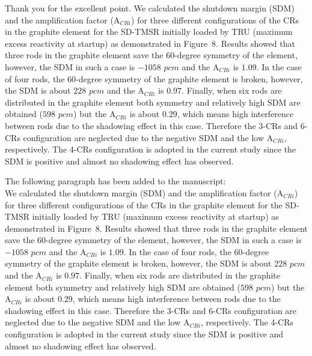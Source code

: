 \documentclass[answers,11pt]{exam}
\begin{document}
\begin{questions}
        \begin{solution}
                 Thank you for the excellent point. We calculated the shutdown margin (SDM) and the amplification factor (A$_{CRi}$) for three different configurations of the CRs in the graphite element for the SD-TMSR initially loaded by TRU (maximum excess reactivity at startup) as demonstrated in Figure~8. Results showed that three rods in the graphite element save the 60-degree symmetry of the element, however, the SDM in such a case is $-1058$ $pcm$ and the A$_{CRi}$ is $1.09$. In the case of four rods, the 60-degree symmetry of the graphite element is broken, however, the SDM is about $228$ $pcm$ and the A$_{CRi}$ is $0.97$. Finally, when six rods are distributed in the graphite element both symmetry and relatively high SDM are obtained ($598$ $pcm$) but the A$_{CRi}$ is about $0.29$, which means high interference between rods due to the shadowing effect in this case. Therefore the 3-CRs and 6-CRs configuration are neglected due to the negative SDM and the low A$_{CRi}$, respectively. The 4-CRs configuration is adopted in the current study since the SDM is positive and almost no shadowing effect has observed.
                 
                 The following paragraph has been added to the manuscript:\\
               
We calculated the shutdown margin (SDM) and the amplification factor (A$_{CRi}$) for three different configurations of the CRs in the graphite element for the SD-TMSR initially loaded by TRU (maximum excess reactivity at startup) as demonstrated in Figure~8. Results showed that three rods in the graphite element save the 60-degree symmetry of the element, however, the SDM in such a case is $-1058$ $pcm$ and the A$_{CRi}$ is $1.09$. In the case of four rods, the 60-degree symmetry of the graphite element is broken, however, the SDM is about $228$ $pcm$ and the A$_{CRi}$ is $0.97$. Finally, when six rods are distributed in the graphite element both symmetry and relatively high SDM are obtained ($598$ $pcm$) but the A$_{CRi}$ is about $0.29$, which means high interference between rods due to the shadowing effect in this case. Therefore the 3-CRs and 6-CRs configuration are neglected due to the negative SDM and the low A$_{CRi}$, respectively. The 4-CRs configuration is adopted in the current study since the SDM is positive and almost no shadowing effect has observed.


                 
        \end{solution}


\end{questions}
\end{document}
